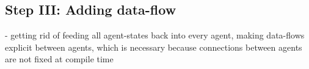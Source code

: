 \subsection{Step III: Adding data-flow}
- getting rid of feeding all agent-states back into every agent, making data-flows explicit between agents, which is necessary because connections between agents are not fixed at compile time
